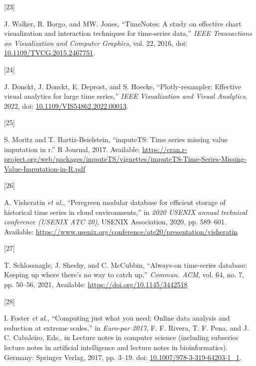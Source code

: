 \documentclass{article}
\newlength{\cslhangindent}
\newlength{\csllabelwidth}
\newlength{\cslentryspacingunit} %
\newenvironment{CSLReferences}[2] %
 {%
  \setlength{\parindent}{0pt}
  \ifodd #1
  \let\oldpar\par
  \def\par{\hangindent=\cslhangindent\oldpar}
  \fi
  \setlength{\parskip}{#2\cslentryspacingunit}
 }%
 {}
\newcommand{\CSLLeftMargin}[1]{\parbox[t]{\csllabelwidth}{#1}}
\newcommand{\CSLRightInline}[1]{\parbox[t]{\linewidth - \csllabelwidth}{#1}\break}
\begin{document}
\begin{CSLReferences}{0}{0}
\leavevmode{}%
\CSLLeftMargin{{[}23{]} }
\CSLRightInline{J. Walker, R. Borgo, and MW. Jones, {``TimeNotes: A
study on effective chart visualization and interaction techniques for
time-series data,''} \emph{IEEE Transactions on Visualization and
Computer Graphics}, vol. 22, 2016, doi:
\href{https://doi.org/10.1109/TVCG.2015.2467751}{10.1109/TVCG.2015.2467751}.}

\leavevmode{}%
\CSLLeftMargin{{[}24{]} }
\CSLRightInline{J. Donckt, J. Donckt, E. Deprost, and S. Hoecke,
{``Plotly-resampler: Effective visual analytics for large time
series,''} \emph{IEEE Visualization and Visual Analytics}, 2022, doi:
\href{https://doi.org/10.1109/VIS54862.2022.00013}{10.1109/VIS54862.2022.00013}.}

\leavevmode{}%
\CSLLeftMargin{{[}25{]} }
\CSLRightInline{S. Moritz and T. Bartiz-Beielstein, {``imputeTS: Time
series missing value imputation in r.''} R Journal, 2017. Available:
\url{https://cran.r-project.org/web/packages/imputeTS/vignettes/imputeTS-Time-Series-Missing-Value-Imputation-in-R.pdf}}

\leavevmode{}%
\CSLLeftMargin{{[}26{]} }
\CSLRightInline{A. Visheratin \emph{et al.}, {``Peregreen {\textendash}
modular database for efficient storage of historical time series in
cloud environments,''} in \emph{2020 USENIX annual technical conference
(USENIX ATC 20)}, USENIX Association, 2020, pp. 589--601. Available:
\url{https://www.usenix.org/conference/atc20/presentation/visheratin}}

\leavevmode{}%
\CSLLeftMargin{{[}27{]} }
\CSLRightInline{T. Schlossnagle, J. Sheehy, and C. McCubbin,
{``Always-on time-series database: Keeping up where there's no way to
catch up,''} \emph{Commun. ACM}, vol. 64, no. 7, pp. 50--56, 2021,
Available: \url{https://doi.org/10.1145/3442518}}

\leavevmode{}%
\CSLLeftMargin{{[}28{]} }
\CSLRightInline{I. Foster \emph{et al.}, {``Computing just what you
need: Online data analysis and reduction at extreme scales,''} in
\emph{Euro-par 2017}, F. F. Rivera, T. F. Pena, and J. C. Cabaleiro,
Eds., in Lecture notes in computer science (including subseries lecture
notes in artificial intelligence and lecture notes in bioinformatics).
Germany: Springer Verlag, 2017, pp. 3--19. doi:
\href{https://doi.org/10.1007/978-3-319-64203-1_1}{10.1007/978-3-319-64203-1\_1}.}


\end{CSLReferences}
\end{document}
